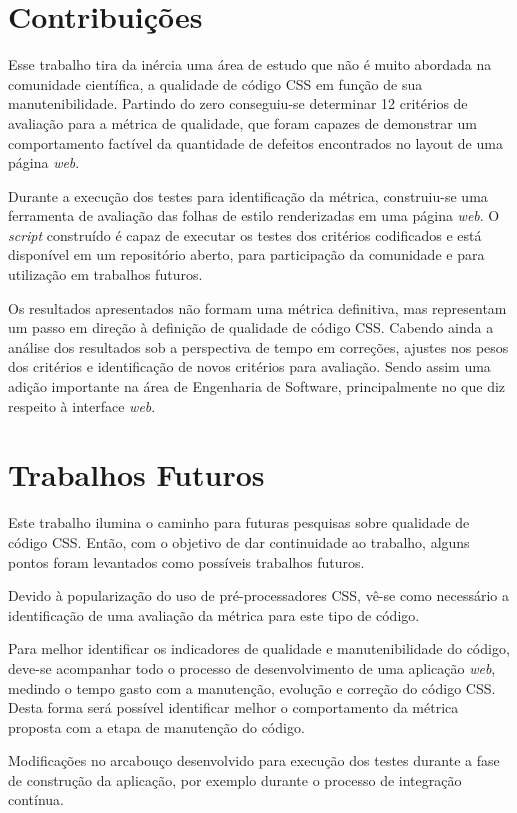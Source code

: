 \section{Contribuições}

Esse trabalho tira da inércia uma área de estudo que não é muito abordada na comunidade científica, a qualidade de código CSS em função de sua manutenibilidade. Partindo do zero conseguiu-se determinar 12 critérios de avaliação para a métrica de qualidade, que foram capazes de demonstrar um comportamento factível da quantidade de defeitos encontrados no layout de uma página \textit{web}. 

Durante a execução dos testes para identificação da métrica, construiu-se uma ferramenta de avaliação das folhas de estilo renderizadas em uma página \textit{web}. O \textit{script} construído é capaz de executar os testes dos critérios codificados e está disponível em um repositório aberto, para participação da comunidade e para utilização em trabalhos futuros.

Os resultados apresentados não formam uma métrica definitiva, mas representam um passo em direção à definição de qualidade de código CSS. Cabendo ainda a análise dos resultados sob a perspectiva de tempo em correções, ajustes nos pesos dos critérios e identificação de novos critérios para avaliação. Sendo assim uma adição importante na área de Engenharia de Software, principalmente no que diz respeito à interface \textit{web}.

\section{Trabalhos Futuros}

Este trabalho ilumina o caminho para futuras pesquisas sobre qualidade de código CSS. Então, com o objetivo de dar continuidade ao trabalho, alguns pontos foram levantados como possíveis trabalhos futuros.

Devido à popularização do uso de pré-processadores CSS, vê-se como necessário a identificação de uma avaliação da métrica para este tipo de código.

Para melhor identificar os indicadores de qualidade e manutenibilidade do código, deve-se acompanhar todo o processo de desenvolvimento de uma aplicação \textit{web}, medindo o tempo gasto com a manutenção, evolução e correção do código CSS. Desta forma será possível identificar melhor o comportamento da métrica proposta com a etapa de manutenção do código.

Modificações no arcabouço desenvolvido para execução dos testes durante a fase de construção da aplicação, por exemplo durante o processo de integração contínua.